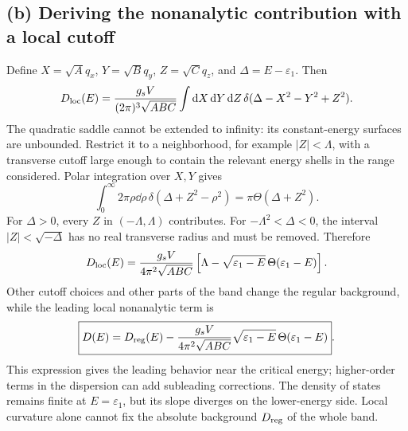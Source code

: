 \subsection*{(b) Deriving the nonanalytic contribution with a local cutoff}
Define $X=\sqrt A q_x$, $Y=\sqrt B q_y$, $Z=\sqrt C q_z$, and $\Delta=E-\varepsilon_1$. Then
\[
D_{\rm loc}(E)=\frac{g_sV}{(2\pi)^3\sqrt{ABC}}
\int\mathop{}\!\mathrm{d} X\mathop{}\!\mathrm{d} Y\mathop{}\!\mathrm{d} Z\,
\delta(\Delta-X^2-Y^2+Z^2).
\]
The quadratic saddle cannot be extended to infinity: its constant-energy surfaces are unbounded. Restrict it to a neighborhood, for example $|Z|<\Lambda$, with a transverse cutoff large enough to contain the relevant energy shells in the range considered. Polar integration over $X,Y$ gives
\[
\int_0^{\infty}2\pi\rho\dd\rho\,
\delta(\Delta+Z^2-\rho^2)=\pi\Theta(\Delta+Z^2).
\]
For $\Delta>0$, every $Z$ in $(-\Lambda,\Lambda)$ contributes. For
$-\Lambda^2<\Delta<0$, the interval $|Z|<\sqrt{-\Delta}$ has no real transverse radius and must be removed. Therefore
\[
D_{\rm loc}(E)=\frac{g_sV}{4\pi^2\sqrt{ABC}}
\left[\Lambda-\sqrt{\varepsilon_1-E}\,
\Theta(\varepsilon_1-E)\right].
\]
Other cutoff choices and other parts of the band change the regular background, while the leading local nonanalytic term is
\[
\boxed{D(E)=D_{\rm reg}(E)
-\frac{g_sV}{4\pi^2\sqrt{ABC}}
\sqrt{\varepsilon_1-E}\,\Theta(\varepsilon_1-E)}.
\]
This expression gives the leading behavior near the critical energy; higher-order terms in the dispersion can add subleading corrections. The density of states remains finite at $E=\varepsilon_1$, but its slope diverges on the lower-energy side. Local curvature alone cannot fix the absolute background $D_{\rm reg}$ of the whole band.
\begin{center}
\end{center}

